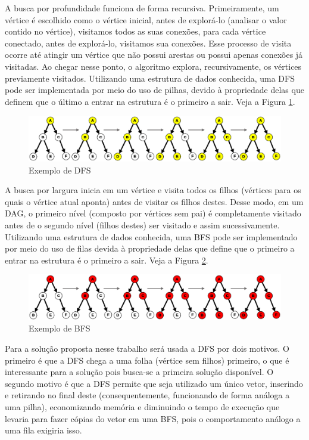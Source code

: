       A busca por profundidade funciona de forma recursiva. Primeiramente, um vértice é escolhido como o vértice inicial, antes de explorá-lo (analisar o valor contido no vértice), visitamos todos as suas conexões, para cada vértice conectado, antes de explorá-lo, visitamos sua conexões. Esse processo de visita ocorre até atingir um vértice que não possui arestas ou possui apenas conexões já visitadas. Ao chegar nesse ponto, o algoritmo explora, recursivamente, os vértices previamente visitados. Utilizando uma estrutura de dados conhecida, uma DFS pode ser implementada por meio do uso de pilhas, devido à propriedade delas que definem que o último a entrar na estrutura é o primeiro a sair. Veja a Figura \ref{dfs}.

      \begin{figure}[htb]
        \centering
        \includegraphics[scale=0.25]{figuras/dfs.eps}
        \caption{Exemplo de DFS}
        \label{dfs}
      \end{figure}


      A busca por largura inicia em um vértice e visita todos os filhos (vértices para os quais o vértice atual aponta) antes de visitar os filhos destes. Desse modo, em um DAG, o primeiro nível (composto por vértices sem pai) é completamente visitado antes de o segundo nível (filhos destes) ser visitado e assim sucessivamente. Utilizando uma estrutura de dados conhecida, uma BFS pode ser implementado por meio do uso de filas devida à propriedade delas que define que o primeiro a entrar na estrutura é o primeiro a sair. Veja a Figura \ref{bfs}.

      \begin{figure}[htb]
        \centering
        \includegraphics[scale=0.25]{figuras/bfs.eps}
        \caption{Exemplo de BFS}
        \label{bfs}
      \end{figure}

      Para a solução proposta nesse trabalho será usada a DFS por dois motivos. O primeiro é que a DFS chega a uma folha (vértice sem filhos) primeiro, o que é interessante para a solução pois busca-se a primeira solução disponível. O segundo motivo é que a DFS permite que seja utilizado um único vetor, inserindo e retirando no final deste (consequentemente, funcionando de forma análoga a uma pilha), economizando memória e diminuindo o tempo de execução que levaria para fazer cópias do vetor em uma BFS, pois o comportamento análogo a uma fila exigiria isso.


